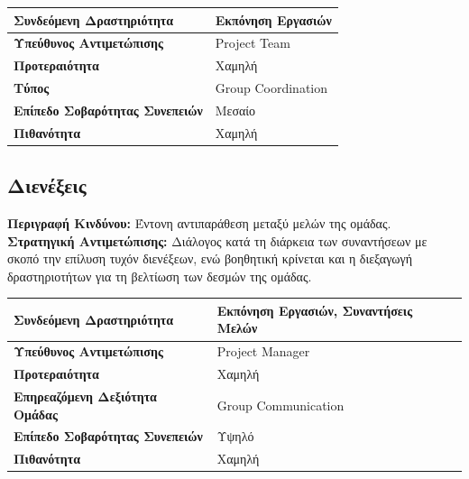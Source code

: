 \documentclass{article}
\newcommand\T{\rule{0pt}{2.6ex}}       %
\newcommand\B{\rule[-1.2ex]{0pt}{0pt}}
\begin{document}
 \begin{center}
     \begin{tabular}{|l|l|}
     \hline
      \textbf{Συνδεόμενη Δραστηριότητα}   & Εκπόνηση Εργασιών \T\B \\ 
      \hline
      \textbf{Υπεύθυνος Αντιμετώπισης} & Project Team \T\B \\
      \hline
      \textbf{Προτεραιότητα} & Χαμηλή \T\B \\
      \hline
      \textbf{Τύπος} & Group Coordination \T\B \\
      \hline
      \textbf{Επίπεδο Σοβαρότητας Συνεπειών} & Μεσαίο \T\B \\
      \hline
      \textbf{Πιθανότητα} & Χαμηλή \T\B \\
      \hline
     \end{tabular}
 \end{center}
 
 \newpage
 
 \subsection{Διενέξεις}
 
\textbf{Περιγραφή Κινδύνου:} Έντονη αντιπαράθεση μεταξύ μελών της ομάδας.\\

\textbf{Στρατηγική Αντιμετώπισης:} Διάλογος κατά τη διάρκεια των συναντήσεων με σκοπό την επίλυση τυχόν διενέξεων, ενώ βοηθητική κρίνεται και η διεξαγωγή δραστηριοτήτων για τη βελτίωση των δεσμών της ομάδας.
 
  \begin{center}
     \begin{tabular}{|l|l|}
     \hline
      \textbf{Συνδεόμενη Δραστηριότητα}   & Εκπόνηση Εργασιών, Συναντήσεις Μελών \T\B \\ 
      \hline
      \textbf{Υπεύθυνος Αντιμετώπισης} & Project Manager \T\B \\
      \hline
      \textbf{Προτεραιότητα} & Χαμηλή \T\B \\
      \hline
      \textbf{Επηρεαζόμενη Δεξιότητα Ομάδας} & Group Communication \T\B \\
      \hline
      \textbf{Επίπεδο Σοβαρότητας Συνεπειών} & Υψηλό \T\B \\
      \hline
      \textbf{Πιθανότητα} & Χαμηλή \T\B \\
      \hline
     \end{tabular}
 \end{center}
 
\end{document}

